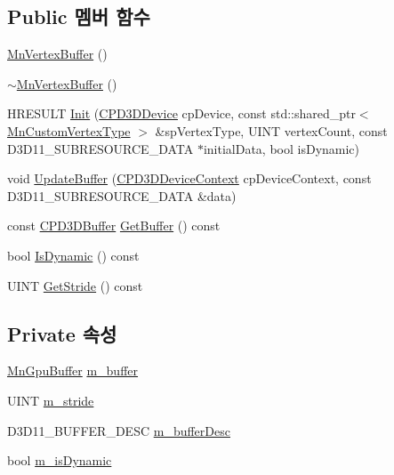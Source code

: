 \subsection*{Public 멤버 함수}
\begin{DoxyCompactItemize}
\item 
\hyperlink{class_m_n_l_1_1_mn_vertex_buffer_a9b770153193d4ce3f9d6cc36e9872db1}{Mn\+Vertex\+Buffer} ()
\item 
\hyperlink{class_m_n_l_1_1_mn_vertex_buffer_ab1b8174dcac75378cecd1a55dea31730}{$\sim$\+Mn\+Vertex\+Buffer} ()
\item 
H\+R\+E\+S\+U\+LT \hyperlink{class_m_n_l_1_1_mn_vertex_buffer_a4adedad347ffe52e4ab4e862c3affc1a}{Init} (\hyperlink{namespace_m_n_l_a1eec210db8f309a4a9ac0d9658784c31}{C\+P\+D3\+D\+Device} cp\+Device, const std\+::shared\+\_\+ptr$<$ \hyperlink{class_m_n_l_1_1_mn_custom_vertex_type}{Mn\+Custom\+Vertex\+Type} $>$ \&sp\+Vertex\+Type, U\+I\+NT vertex\+Count, const D3\+D11\+\_\+\+S\+U\+B\+R\+E\+S\+O\+U\+R\+C\+E\+\_\+\+D\+A\+TA $\ast$initial\+Data, bool is\+Dynamic)
\item 
void \hyperlink{class_m_n_l_1_1_mn_vertex_buffer_abf79f766df9f9df7850fded4c3f714c8}{Update\+Buffer} (\hyperlink{namespace_m_n_l_aab3aabb6c9360e44ddc8b0bb563c2107}{C\+P\+D3\+D\+Device\+Context} cp\+Device\+Context, const D3\+D11\+\_\+\+S\+U\+B\+R\+E\+S\+O\+U\+R\+C\+E\+\_\+\+D\+A\+TA \&data)
\item 
const \hyperlink{namespace_m_n_l_aab9c90a8c27ac6410a9cc7cd89efeef1}{C\+P\+D3\+D\+Buffer} \hyperlink{class_m_n_l_1_1_mn_vertex_buffer_ac18e530b026a8a625b211ad97ec78c45}{Get\+Buffer} () const
\item 
bool \hyperlink{class_m_n_l_1_1_mn_vertex_buffer_aebc750ff8566b4ac34bd3c741559871a}{Is\+Dynamic} () const
\item 
U\+I\+NT \hyperlink{class_m_n_l_1_1_mn_vertex_buffer_a6c3b80a53b7a47c960b8008aba45a6ed}{Get\+Stride} () const
\end{DoxyCompactItemize}
\subsection*{Private 속성}
\begin{DoxyCompactItemize}
\item 
\hyperlink{class_m_n_l_1_1_mn_gpu_buffer}{Mn\+Gpu\+Buffer} \hyperlink{class_m_n_l_1_1_mn_vertex_buffer_ada880bd29518b5a1f3c429286efe7369}{m\+\_\+buffer}
\item 
U\+I\+NT \hyperlink{class_m_n_l_1_1_mn_vertex_buffer_a9b09d0ea70aef7003a065572fdb3d8f8}{m\+\_\+stride}
\item 
D3\+D11\+\_\+\+B\+U\+F\+F\+E\+R\+\_\+\+D\+E\+SC \hyperlink{class_m_n_l_1_1_mn_vertex_buffer_a8f88663e98b6691b8f8a16c0ba3e3781}{m\+\_\+buffer\+Desc}
\item 
bool \hyperlink{class_m_n_l_1_1_mn_vertex_buffer_aee7207f437d181e4be2670e0e9e12dc3}{m\+\_\+is\+Dynamic}
\end{DoxyCompactItemize}



